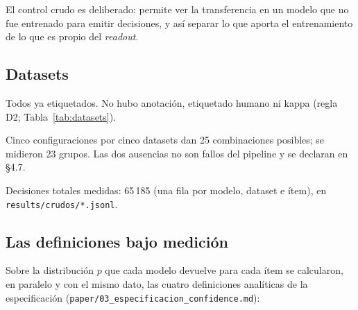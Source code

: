 El control crudo es deliberado: permite ver la transferencia en un modelo que no fue entrenado para
emitir decisiones, y así separar lo que aporta el entrenamiento de lo que es propio del \emph{readout}.

\subsection{Datasets}

Todos ya etiquetados. No hubo anotación, etiquetado humano ni kappa (regla D2; Tabla~\ref{tab:datasets}).

\begin{table}[t]
\centering
\caption{Datasets usados, con su cardinalidad $n$ y el número de ítems medidos. Los cinco están ya
etiquetados: no hubo anotación humana.}
\label{tab:datasets}
{\scriptsize
\setlength{\tabcolsep}{3pt}
}
\end{table}

Cinco configuraciones por cinco datasets dan 25 combinaciones posibles; se midieron 23 grupos. Las
dos ausencias no son fallos del pipeline y se declaran en §4.7.

Decisiones totales medidas: 65\,185 (una fila por modelo, dataset e ítem), en
\texttt{results/crudos/*.jsonl}.

\subsection{Las definiciones bajo medición}

Sobre la distribución $p$ que cada modelo devuelve para cada ítem se calcularon, en paralelo y con el mismo
dato, las cuatro definiciones analíticas de la especificación
(\texttt{paper/03\_especificacion\_confidence.md}):

